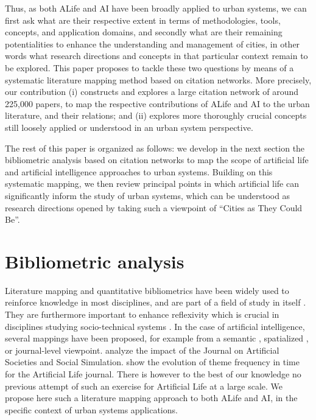 \documentclass[10pt]{article}
\begin{document}
Thus, as both ALife and AI have been broadly applied to urban systems, we can first ask what are their respective extent in terms of methodologies, tools, concepts, and application domains, and secondly what are their remaining potentialities to enhance the understanding and management of cities, in other words what research directions and concepts in that particular context remain to be explored. This paper proposes to tackle these two questions by means of a systematic literature mapping method based on citation networks. More precisely, our contribution (i) constructs and explores a large citation network of around 225,000 papers, to map the respective contributions of ALife and AI to the urban literature, and their relations; and (ii) explores more thoroughly crucial concepts still loosely applied or understood in an urban system perspective.


The rest of this paper is organized as follows: we develop in the next section the bibliometric analysis based on citation networks to map the scope of artificial life and artificial intelligence approaches to urban systems. Building on this systematic mapping, we then review principal points in which artificial life can significantly inform the study of urban systems, which can be understood as research directions opened by taking such a viewpoint of ``Cities as They Could Be''.


\section{Bibliometric analysis}



Literature mapping and quantitative bibliometrics have been widely used to reinforce knowledge in most disciplines, and are part of a field of study in itself \cite{leydesdorff2001challenge}. They are furthermore important to enhance reflexivity which is crucial in disciplines studying socio-technical systems \cite{raimbault2019empowering}. In the case of artificial intelligence, several mappings have been proposed, for example from a semantic \citep{van1993neural}, spatialized \citep{niu2016global}, or journal-level \citep{ibanez2011using} viewpoint. \cite{squazzoni2013social} analyze the impact of the Journal on Artificial Societies and Social Simulation. \cite{aguilar2014past} show the evolution of theme frequency in time for the Artificial Life journal. There is however to the best of our knowledge no previous attempt of such an exercise for Artificial Life at a large scale. We propose here such a literature mapping approach to both ALife and AI, in the specific context of urban systems applications.
\end{document}
